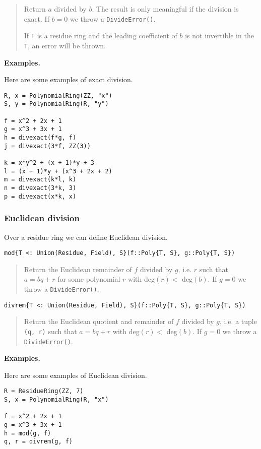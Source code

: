 \documentclass[a4paper,10pt]{article}
\newcommand{\code}{\lstinline}
\newcommand{\desc}[1]{\vspace{-3mm}\begin{quote}#1\end{quote}}
\begin{document}
{{{\desc{Return $a$ divided by $b$. The result is only meaningful if the division is
exact. If $b = 0$ we throw a \code{DivideError()}. 

If \code{T} is a residue ring and the leading coefficient of $b$ is not invertible
in the \code{T}, an error will be thrown.} 

\textbf{Examples.}

Here are some examples of exact division.

\begin{lstlisting}
R, x = PolynomialRing(ZZ, "x")
S, y = PolynomialRing(R, "y")

f = x^2 + 2x + 1
g = x^3 + 3x + 1
h = divexact(f*g, f)
j = divexact(3*f, ZZ(3))

k = x*y^2 + (x + 1)*y + 3
l = (x + 1)*y + (x^3 + 2x + 2)
m = divexact(k*l, k)
n = divexact(3*k, 3)
p = divexact(x*k, x)
\end{lstlisting}

\subsubsection{Euclidean division}

Over a residue ring we can define Euclidean division.

\begin{lstlisting}
mod{T <: Union(Residue, Field), S}(f::Poly{T, S}, g::Poly{T, S})
\end{lstlisting}

\desc{Return the Euclidean remainder of $f$ divided by $g$, i.e. $r$ such 
that $a = bq + r$ for some polynomial $r$ with deg$(r) <$ deg$(b)$. If 
$g = 0$ we throw a \code{DivideError()}.}

\begin{lstlisting}
divrem{T <: Union(Residue, Field), S}(f::Poly{T, S}, g::Poly{T, S})
\end{lstlisting}

\desc{Return the Euclidean quotient and remainder of $f$ divided by $g$, i.e.
a tuple \code{(q, r)} such that $a = bq + r$ with deg$(r) <$ deg$(b)$. If 
$g = 0$ we throw a \code{DivideError()}.}

\textbf{Examples.}

Here are some examples of Euclidean division.

\begin{lstlisting}
R = ResidueRing(ZZ, 7)
S, x = PolynomialRing(R, "x")

f = x^2 + 2x + 1
g = x^3 + 3x + 1
h = mod(g, f)
q, r = divrem(g, f)


\end{lstlisting}}}}
\end{document}
